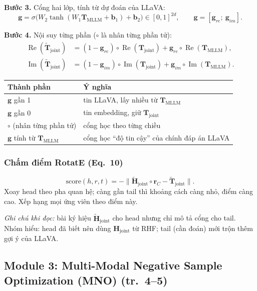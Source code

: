 \documentclass[11pt,a4paper]{article}
\newcommand{\Hj}{\mathbf{H}_{\mathrm{joint}}}
\newcommand{\Tj}{\mathbf{T}_{\mathrm{joint}}}
\newcommand{\Tjt}{\tilde{\mathbf{T}}_{\mathrm{joint}}}
\newcommand{\Hjt}{\tilde{\mathbf{H}}_{\mathrm{joint}}}
\newcommand{\Tm}{\mathbf{T}_{\mathrm{MLLM}}}
\renewcommand{\Re}{\operatorname{Re}}
\renewcommand{\Im}{\operatorname{Im}}
\newcommand{\score}{\mathrm{score}}
\begin{document}
\textbf{Bước 3.} Cổng hai lớp, tính từ dự đoán của LLaVA:
\begin{equation}
\mathbf{g} = \sigma\big(W_2 \tanh(W_1 \Tm + \mathbf{b}_1) + \mathbf{b}_2\big) \in [0,1]^{2d}, \qquad \mathbf{g} = [\mathbf{g}_{re};\ \mathbf{g}_{im}].
\label{eq:gate}
\end{equation}

\textbf{Bước 4.} Nội suy từng phần ($\circ$ là nhân từng phần tử):
\begin{align}
\Re(\Tjt) &= (1 - \mathbf{g}_{re}) \circ \Re(\Tj) + \mathbf{g}_{re} \circ \Re(\Tm),\label{eq:re}\\
\Im(\Tjt) &= (1 - \mathbf{g}_{im}) \circ \Im(\Tj) + \mathbf{g}_{im} \circ \Im(\Tm).\label{eq:im}
\end{align}

\begin{table}[H]
\centering\small
\begin{tabular}{@{}ll@{}}
\toprule
Thành phần & Ý nghĩa\\
\midrule
$\mathbf{g}$ gần 1 & tin LLaVA, lấy nhiều từ $\Tm$\\
$\mathbf{g}$ gần 0 & tin embedding, giữ $\Tj$\\
$\circ$ (nhân từng phần tử) & cổng học theo từng chiều\\
$\mathbf{g}$ tính từ $\Tm$ & cổng học ``độ tin cậy'' của chính đáp án LLaVA\\
\bottomrule
\end{tabular}
\end{table}

\subsubsection{Chấm điểm RotatE (Eq.~10)}

\begin{equation}
\score(h, r, t) = -\big\|\Hjt \circ \mathbf{r}_C - \Tjt\big\|.
\label{eq:score}
\end{equation}
Xoay head theo pha quan hệ; càng gần tail thì khoảng cách càng nhỏ, điểm càng cao. Xếp hạng mọi ứng viên theo điểm này.

\textit{Ghi chú khi đọc:} bài ký hiệu $\Hjt$ cho head nhưng chỉ mô tả cổng cho tail. Nhóm hiểu: head đã biết nên dùng $\Hj$ từ RHF; tail (cần đoán) mới trộn thêm gợi ý của LLaVA.

\subsection{Module 3: Multi-Modal Negative Sample Optimization (MNO) (tr.~4--5)}
\end{document}

